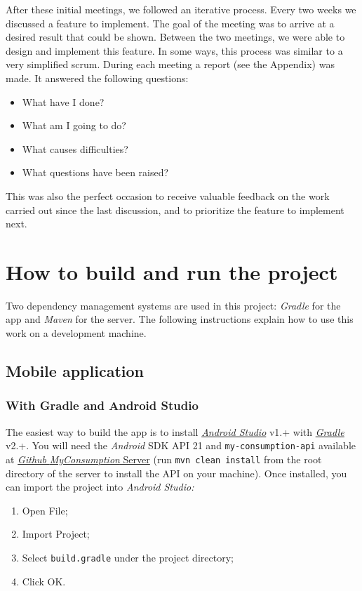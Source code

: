 \documentclass[a4paper, oneside, 11pt]{book}
\begin{document}
After these initial meetings, we followed an iterative process. Every two weeks we discussed a feature to implement. The goal of the meeting was to arrive at a desired result that could be shown. Between the two meetings, we were able to design and implement this feature. In some ways, this process was similar to a very simplified scrum. During each meeting a report (see the Appendix) was made. It answered the following questions:
\begin{itemize}
	\item What have I done?
	\item What am I going to do?
	\item What causes difficulties?
	\item What questions have been raised?
\end{itemize}

This was also the perfect occasion to receive valuable feedback on the work carried out since the last discussion, and to prioritize the feature to implement next.

\newpage
\section{How to build and run the project}
Two dependency management systems are used in this project: \textit{Gradle} for the app and \textit{Maven} for the server. The following instructions explain how to use this work on a development machine.

\subsection{Mobile application}
\subsubsection{With Gradle and Android Studio}

The easiest way to build the app is to install \href{https://developer.android.com/sdk/index.html}{\textit{Android Studio}} v1.+ with \href{https://www.gradle.org/}{\textit{Gradle}} v2.+. You will need the \textit{Android} SDK API 21 and \texttt{my-consumption-api} available at \href{https://github.com/S23Y/myconsumption-server/}{\textit{Github} \textit{MyConsumption} Server} (run \texttt{mvn clean install} from the root directory of the server to install the API on your machine). Once installed, you can import the project into \textit{Android Studio:}
\begin{enumerate}
	\item Open File;
	\item Import Project;
	\item Select \texttt{build.gradle} under the project directory;
	\item Click OK.
\end{enumerate}
\end{document}
